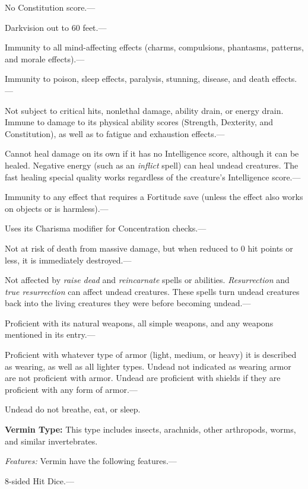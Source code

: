 \documentclass{article}
\begin{document}
No Constitution score.---

Darkvision out to 60 feet.---

Immunity to all mind-affecting effects (charms, compulsions, phantasms, patterns, 
and morale effects).---

Immunity to poison, sleep effects, paralysis, stunning, disease, and death effects.---

Not subject to critical hits, nonlethal damage, ability drain, or energy drain. 
Immune to damage to its physical ability scores (Strength, Dexterity, and Constitution), 
as well as to fatigue and exhaustion effects.---

Cannot heal damage on its own if it has no Intelligence score, although it can 
be healed. Negative energy (such as an \textit{inflict }spell) can heal undead 
creatures. The fast healing special quality works regardless of the creature's 
Intelligence score.---

Immunity to any effect that requires a Fortitude save (unless the effect also works 
on objects or is harmless).---

Uses its Charisma modifier for Concentration checks.---

Not at risk of death from massive damage, but when reduced to 0 hit points or less, 
it is immediately destroyed.---

Not affected by \textit{raise dead }and \textit{reincarnate }spells or abilities. 
\textit{Resurrection }and \textit{true resurrection }can affect undead creatures. 
These spells turn undead creatures back into the living creatures they were before 
becoming undead.---

Proficient with its natural weapons, all simple weapons, and any weapons mentioned 
in its entry.---

Proficient with whatever type of armor (light, medium, or heavy) it is described 
as wearing, as well as all lighter types. Undead not indicated as wearing armor 
are not proficient with armor. Undead are proficient with shields if they are proficient 
with any form of armor.---

Undead do not breathe, eat, or sleep.

\vspace{12pt}
\textbf{Vermin Type:} This type includes insects, arachnids, other arthropods, 
worms, and similar invertebrates.

\textit{Features: }Vermin have the following features.---

8-sided Hit Dice.---
\end{document}
